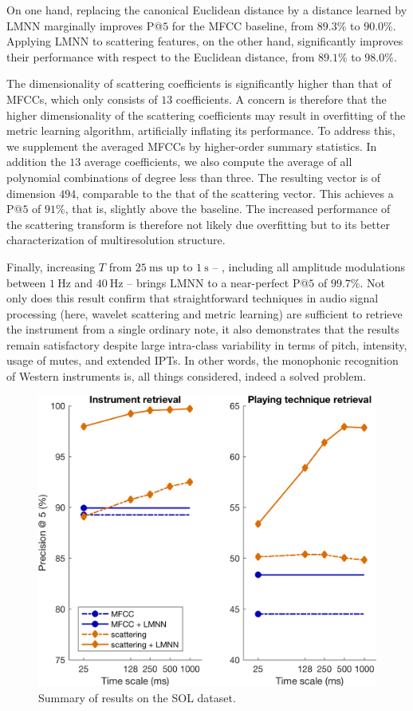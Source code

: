 On one hand, replacing the canonical Euclidean distance by a distance learned by LMNN marginally improves P@$5$ for the MFCC baseline, from $89.3\%$ to $90.0\%$.
Applying LMNN to scattering features, on the other hand, significantly improves their performance with respect to the Euclidean distance, from $89.1\%$ to $98.0\%$.

The dimensionality of scattering coefficients is significantly higher than that of MFCCs, which only consists of $13$ coefficients.
A concern is therefore that the higher dimensionality of the scattering coefficients may result in overfitting of the metric learning algorithm, artificially inflating its performance.
To address this, we supplement the averaged MFCCs by higher-order summary statistics.
In addition the $13$ average coefficients, we also compute the average of all polynomial combinations of degree less than three.
The resulting vector is of dimension $494$, comparable to the that of the scattering vector.
This achieves a P@$5$ of $91\%$, that is, slightly above the baseline.
The increased performance of the scattering transform is therefore not likely due overfitting but to its better characterization of multiresolution structure.

Finally, increasing $T$ from $\SI{25}{\milli\second}$ up to $\SI{1}{\second}$ -- \ie{}, including all amplitude modulations between $\SI{1}{\Hz}$ and $\SI{40}{\Hz}$ -- brings LMNN to a near-perfect P@$5$ of $99.7\%$.
Not only does this result confirm that straightforward techniques in audio signal processing (here, wavelet scattering and metric learning) are sufficient to retrieve the instrument from a single ordinary note, it also demonstrates that the results remain satisfactory despite large intra-class variability in terms of pitch, intensity, usage of mutes, and extended IPTs.
In other words, the monophonic recognition of Western instruments is, all things considered, indeed a solved problem.

\begin{figure}
\includegraphics[width=\linewidth,keepaspectratio]{./figs/results/results.png}
\caption{Summary of results on the SOL dataset.}
\label{fig:results}
\end{figure}


